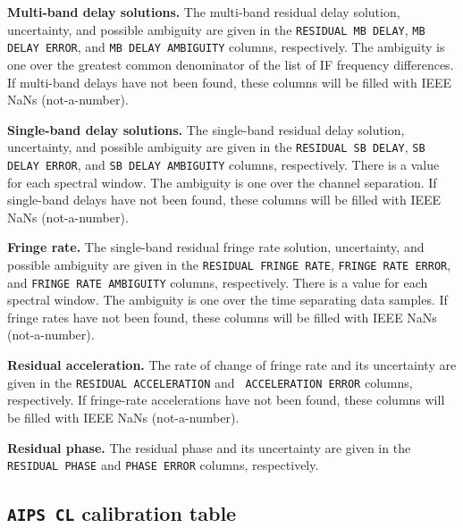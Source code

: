 \documentclass[twoside]{article}
\begin{document}
{\bf Multi-band delay solutions.} The multi-band residual delay
solution, uncertainty, and possible ambiguity are given in the
{\tt RESIDUAL MB DELAY}, {\tt MB DELAY ERROR}, and {\tt MB DELAY
  AMBIGUITY} columns, respectively.  The ambiguity is one over the
greatest common denominator of the list of IF frequency differences.
If multi-band delays have not been found, these columns will be filled
with IEEE NaNs (not-a-number).

{\bf Single-band delay solutions.} The single-band residual delay
solution, uncertainty, and possible ambiguity are given in the
{\tt RESIDUAL SB DELAY}, {\tt SB DELAY ERROR}, and {\tt SB DELAY
  AMBIGUITY} columns, respectively.  There is a value for each
spectral window.  The ambiguity is one over the channel separation.
If single-band delays have not been found, these columns will be
filled with IEEE NaNs (not-a-number).

{\bf Fringe rate.} The single-band residual fringe rate solution,
uncertainty, and possible ambiguity are given in the {\tt RESIDUAL
FRINGE RATE}, {\tt FRINGE RATE ERROR}, and {\tt FRINGE RATE AMBIGUITY}
columns, respectively.  There is a value for each spectral window.
The ambiguity is one over the time separating data samples.  If fringe
rates have not been found, these columns will be filled with IEEE NaNs
(not-a-number).

{\bf Residual acceleration.}  The rate of change of fringe rate and
its uncertainty are given in the {\tt RESIDUAL ACCELERATION} and {\tt
ACCELERATION ERROR} columns, respectively.  If fringe-rate
accelerations have not been found, these columns will be filled with
IEEE NaNs (not-a-number).

{\bf Residual phase.}  The residual phase and its uncertainty are
given in the {\tt RESIDUAL PHASE} and {\tt PHASE ERROR} columns,
respectively.

\subsection{{\tt AIPS CL} calibration table}
\label{s:CL}
\end{document}
